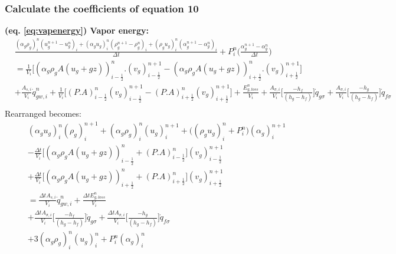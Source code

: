 \documentclass[11pt,letterpaper,titlepage]{article}
\newcommand{\half}{\frac{1}{2}}
\begin{document}
\newpage
\subsubsection{Calculate the coefficients of equation 10}
\textbf{(eq. \ref{eq:vapenergy}) Vapor energy:}
\begin{equation*}
\begin{aligned}
&\frac{(\alpha_g\rho_g)_i^n (u_g^{n+1}-u_g^{n})_i+(\alpha_g u_g)_i^n   (\rho_g^{n+1} - \rho_g^n)_i+(\rho_g u_g)_i^n     (\alpha_g^{n+1}-\alpha_g^n)_i}{\Delta t} + P_i^n \biggr( \frac{\alpha_g^{n+1}-\alpha_g^n}{\Delta t} \biggr)\\
&=\frac{1}{V_i}\biggr[ (\alpha_g\rho_g A(u_g+gz))_{i-\half}^n.(v_g)_{i-\half}^{n+1} - (\alpha_g\rho_g A(u_g+gz))_{i+\half}^n.(v_g)_{i+\half}^{n+1} \biggr] \\
&+\frac{A_{s,i}}{V_i}\dot{q}_{gw,i}^n + \frac{1}{V_i}\biggr[   (P.A)_{i-\half}^n(v_g)_{i-\half}^{n+1} - (P.A)_{i+\half}^n(v_g)_{i+\half}^{n+1}   \biggr] + \frac{E_{g,loss}^n}{V_i}
+\frac{A_{\sigma,i}}{V_i} \biggr[\frac{- h_f  }{(h_g-h_f)}  \biggr]\dot{q}_{g\sigma}
+\frac{A_{\sigma,i}}{V_i} \biggr[\frac{ - h_g }{(h_g-h_f)}  \biggr]\dot{q}_{f\sigma}\\
\end{aligned}
\end{equation*}
\newline
Rearranged becomes:
\begin{equation*}
\begin{aligned}
&(\alpha_g u_g)_i^n(\rho_g)_i^{n+1}
+(\alpha_g\rho_g)_i^n(u_g)_i^{n+1}
+\biggr( (\rho_g u_g)_i^n+P_i^n \biggr)(\alpha_g)_i^{n+1} \\
&-\frac{\Delta t}{V_i}\biggr[ (\alpha_g\rho_g A(u_g+gz))_{i-\half}^n + (P.A)_{i-\half}^n \biggr](v_g)_{i-\half}^{n+1}\\
&+\frac{\Delta t}{V_i}\biggr[ (\alpha_g\rho_g A(u_g+gz))_{i+\half}^n  + (P.A)_{i+\half}^n   \biggr](v_g)_{i+\half}^{n+1}\\
&=\frac{\Delta t A_{s,i}}{V_i}\dot{q}_{gw,i}^n + \frac{\Delta tE_{g,loss}^n}{V_i}\\
&+\frac{\Delta tA_{\sigma,i}}{V_i} \biggr[\frac{- h_f  }{(h_g-h_f)}  \biggr]\dot{q}_{g\sigma}
+\frac{\Delta tA_{\sigma,i}}{V_i} \biggr[\frac{ - h_g }{(h_g-h_f)}  \biggr]\dot{q}_{f\sigma}\\
&+3(\alpha_g\rho_g)^n_i(u_g)_i^{n}
 +P_i^n (\alpha_g)_i^n
\end{aligned}
\end{equation*}
\newline
\end{document}
